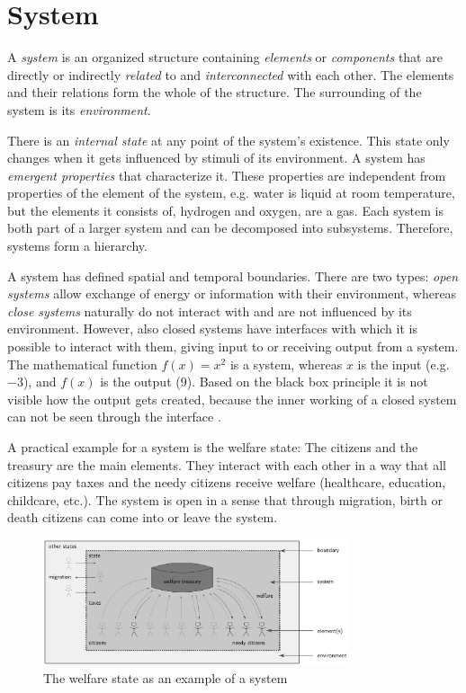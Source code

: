 

\section{System} %
\label{sec:system}

A \emph{system} is an organized structure containing \emph{elements} or \emph{components} that are directly or indirectly \emph{related} to and \emph{interconnected} with each other. The elements and their relations form the whole of the structure. The surrounding of the system is its \emph{environment}.

There is an \emph{internal state} at any point of the system's existence. This state only changes when it gets influenced by stimuli of its environment. A system has \emph{emergent properties} that characterize it. These properties are independent from properties of the element of the system, e.g. water is liquid at room temperature, but the elements it consists of, hydrogen and oxygen, are a gas. Each system is both part of a larger system and can be decomposed into subsystems. Therefore, systems form a hierarchy.

A system has defined spatial and temporal boundaries. There are two types: \emph{open systems} allow exchange of energy or information with their environment, whereas \emph{close systems} naturally do not interact with and are not influenced by its environment. However, also closed systems have interfaces with which it is possible to interact with them, giving input to or receiving output from a system. The mathematical function $f(x) = x^2$ is a system, whereas $x$ is the input (e.g. $-3$), and $f(x)$ is the output ($9$). Based on the black box principle it is not visible how the output gets created, because the inner working of a closed system can not be seen through the interface
\cite{system}.

A practical example for a system is the welfare state: The citizens and the treasury are the main elements. They interact with each other in a way that all citizens pay taxes and the needy citizens receive welfare (healthcare, education, childcare, etc.). The system is open in a sense that through migration, birth or death citizens can come into or leave the system.

\begin{figure}[ht]
  \centering
  \includegraphics[width = 0.8\textwidth]{graphics/basics/social_system}
  \caption{The welfare state as an example of a system}
  \label{fig:social_system}
\end{figure}


